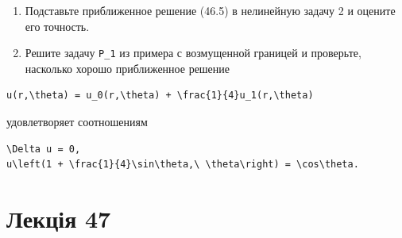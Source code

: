 \documentclass[
  ukrainian,
]{article}
\begin{document}
\begin{enumerate}
\def\labelenumi{\arabic{enumi}.}
\setcounter{enumi}{2}
\item
  Подставьте приближенное решение (46.5) в нелинейную задачу 2 и оцените
  его точность.
\item
  Решите задачу \texttt{P\_1} из примера с возмущенной границей и
  проверьте, насколько хорошо приближенное решение
\end{enumerate}

\begin{verbatim}
u(r,\theta) = u_0(r,\theta) + \frac{1}{4}u_1(r,\theta)
\end{verbatim}

удовлетворяет соотношениям

\begin{verbatim}
\Delta u = 0,
u\left(1 + \frac{1}{4}\sin\theta,\ \theta\right) = \cos\theta.
\end{verbatim}

\section{Лекція 47}\label{ux43bux435ux43aux446ux456ux44f-47}
\end{document}
